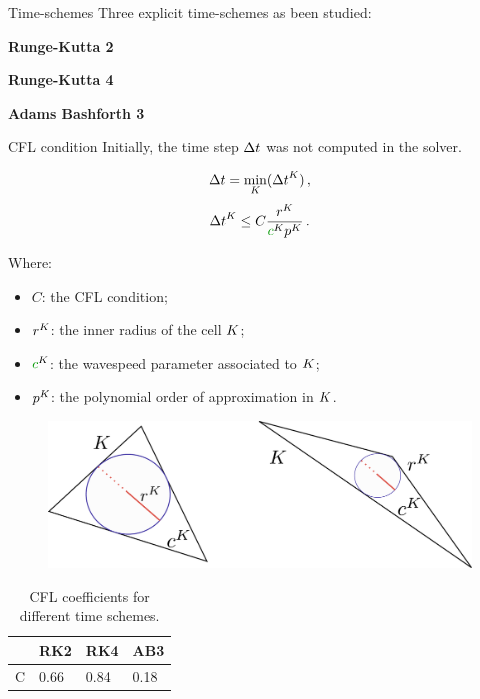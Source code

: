 \begin{frame}[noframenumbering]{Time-schemes}
\scriptsize
Three explicit time-schemes as been studied: \\
\begin{multicols}{3}
\textbf{Runge-Kutta 2}

\columnbreak

\textbf{Runge-Kutta 4}

\columnbreak

\textbf{Adams Bashforth 3}
\end{multicols}

\begin{block}{CFL condition}
Initially, the time step ${\Delta t}$ was not computed in the solver.

\begin{multicols}{2}
\begin{equation}
{\Delta t} = \underset{{K}}{\min}({\Delta t}^{K})\,,
\end{equation}
\begin{equation}
        \deltat^\elementK \le C \frac{r^\elementK}{\velocity^\elementK p^\elementK}\,.
\end{equation}
\vfill

\columnbreak
\tiny
Where:
\begin{itemize}
\item $C$: the CFL condition;
\item $r^{K}$: the inner radius of the cell ${K}$;
\item $\velocity^\elementK$: the wavespeed parameter associated to ${K}$;
\item $p^{K}$: the polynomial order of approximation in ${K}$.
\end{itemize}
\end{multicols}
\end{block}
\begin{overprint}
\begin{figure}[H]
\centering
\includegraphics[scale=0.2]{image/cfl.pdf}
\label{cfl_sketch}
\end{figure}
\begin{table}[H]
\centering
\begin{tabular}{|l|l|l|l|}
\hline
  & RK2  & RK4  & AB3  \\ \hline
C & 0.66 & 0.84 & 0.18 \\ \hline
\end{tabular}
\caption{CFL coefficients for different time schemes.}
\label{coef_cfl}
\end{table}
\end{overprint}

\end{frame}



